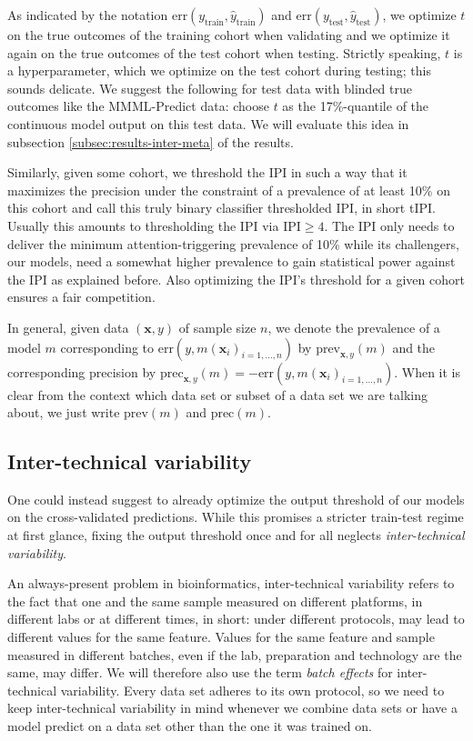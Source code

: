 As indicated by the notation $\text{err}(y_\text{train}, \hat{y}_\text{train})$ and 
$\text{err}(y_\text{test}, \hat{y}_\text{test})$, we optimize $t$ on the true outcomes 
of the training cohort when validating and we optimize it again on the true outcomes of the test cohort 
when testing. Strictly speaking, $t$ is a hyperparameter, which we optimize on the 
test cohort during testing; this sounds delicate. We suggest the following for test data with 
blinded true outcomes like the MMML-Predict data: choose $t$ as the 17\%-quantile of the continuous 
model output on this test data. We will evaluate this idea in subsection 
\ref{subsec:results-inter-meta} of the results.

Similarly, given some cohort, we threshold the IPI in such a way that it maximizes the precision under 
the constraint of a prevalence of at least \num{10}\% on this cohort and call this truly 
binary classifier thresholded IPI, in short tIPI. Usually this amounts to thresholding the IPI via 
$\text{IPI} \geq 4$. The IPI only needs to deliver the minimum 
attention-triggering prevalence of \num{10}\% while its challengers, our models, need a somewhat 
higher prevalence to gain statistical power against the IPI as explained before. Also optimizing 
the IPI's threshold for a given cohort ensures a fair competition.

In general, given data $(\mathbf{x}, y)$ of sample size $n$, we denote the prevalence of a model 
$m$ corresponding to 
$\text{err}(y, m(\mathbf{x}_i)_{i = 1, \ldots, n})$ by $\text{prev}_{\mathbf{x}, y}(m)$ and the corresponding 
precision by $\text{prec}_{\mathbf{x}, y}(m) = -\text{err}(y, m(\mathbf{x}_i)_{i = 1, \ldots, n})$. When it 
is clear from the context which data set or subset of a data set we are talking about, we just write 
$\text{prev}(m)$ and $\text{prec}(m)$.

\subsection{Inter-technical variability} 
One could instead suggest to already optimize the output threshold of our models on the cross-validated 
predictions. While this promises a stricter train-test regime at first glance, fixing the output 
threshold once and for all neglects \textit{inter-technical variability}. 

An always-present problem in bioinformatics, inter-technical variability refers to the fact that 
one and the same sample measured on different platforms, in different labs or at different times, 
in short: under different protocols, may lead to different values for the same feature. 
Values for the same feature and sample measured in different batches, even if the lab, preparation 
and technology are the same, may differ. We will therefore also use the term \textit{batch effects} 
for inter-technical variability. Every data set adheres to its own protocol, so we need to keep
inter-technical variability in mind whenever we combine data sets or have a model predict on a 
data set other than the one it was trained on.


